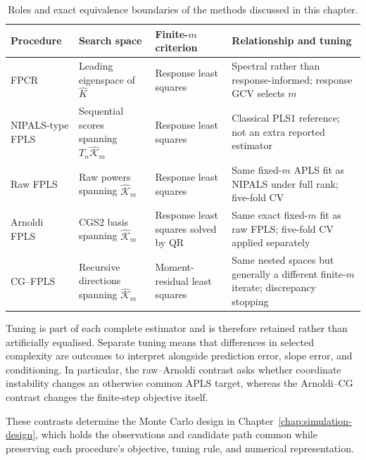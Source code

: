 \begin{table}[!htbp]
    \centering
    \small
    \caption[Roles and equivalence boundaries of the methods]{Roles and exact equivalence boundaries of the methods discussed
    in this chapter.}
    \label{tab:methods-equivalence}
    \begin{tabular}{@{}
        >{\raggedright\arraybackslash}p{2.7cm}
        >{\raggedright\arraybackslash}p{3.3cm}
        >{\raggedright\arraybackslash}p{3.6cm}
        >{\raggedright\arraybackslash}p{4.3cm}@{}}
        \toprule
        Procedure & Search space & Finite-$m$ criterion & Relationship and tuning \\
        \midrule
        FPCR
        & Leading eigenspace of $\widehat K$
        & Response least squares
        & Spectral rather than response-informed; response GCV selects $m$ \\

        NIPALS-type FPLS
        & Sequential scores spanning $T_n\widehat{\mathcal K}_m$
        & Response least squares
        & Classical PLS1 reference; not an extra reported estimator \\

        Raw FPLS
        & Raw powers spanning $\widehat{\mathcal K}_m$
        & Response least squares
        & Same fixed-$m$ APLS fit as NIPALS under full rank; five-fold CV \\

        Arnoldi FPLS
        & CGS2 basis spanning $\widehat{\mathcal K}_m$
        & Response least squares solved by QR
        & Same exact fixed-$m$ fit as raw FPLS; five-fold CV applied separately \\

        CG--FPLS
        & Recursive directions spanning $\widehat{\mathcal K}_m$
        & Moment-residual least squares
        & Same nested spaces but generally a different finite-$m$ iterate;
          discrepancy stopping \\
        \bottomrule
    \end{tabular}
\end{table}

Tuning is part of each complete estimator and is therefore retained rather
than artificially equalised.  Separate tuning means that differences in
selected complexity are outcomes to interpret alongside prediction error,
slope error, and conditioning.  In particular, the raw--Arnoldi contrast asks
whether coordinate instability changes an otherwise common APLS target,
whereas the Arnoldi--CG contrast changes the finite-step objective itself.

These contrasts determine the Monte Carlo design in
Chapter~\ref{chap:simulation-design}, which holds the observations and
candidate path common while preserving each procedure's objective, tuning
rule, and numerical representation.
